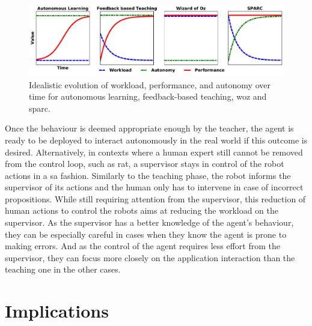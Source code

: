 \begin{figure}[ht]
	\includegraphics[width=1\linewidth]{concept.pdf}
	\centering
	\caption{Idealistic evolution of workload, performance, and autonomy over time for autonomous learning, feedback-based teaching, \gls{woz} and \gls{sparc}.}
	\label{fig:concept}
\end{figure}

Once the behaviour is deemed appropriate enough by the teacher, the agent is ready to be deployed to interact autonomously in the real world if this outcome is desired. Alternatively, in contexts where a human expert still cannot be removed from the control loop, such as \gls{rat}, a supervisor stays in control of the robot actions in a \gls{sa} fashion. Similarly to the teaching phase, the robot informs the supervisor of its actions and the human only has to intervene in case of incorrect propositions. While still requiring attention from the supervisor, this reduction of human actions to control the robots aims at reducing the workload on the supervisor. As the supervisor has a better knowledge of the agent's behaviour, they can be especially careful in cases when they know the agent is prone to making errors. And as the control of the agent requires less effort from the supervisor, they can focus more closely on the application interaction than the teaching one in the other cases. 

\section{Implications}

